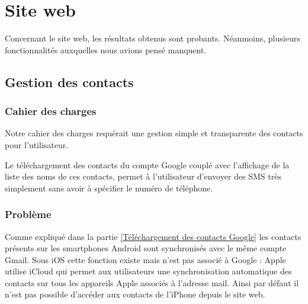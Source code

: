 \section{Site web}

Concernant le site web, les résultats obtenus sont probants.
Néanmoins, plusieurs fonctionnalités auxquelles nous avions pensé manquent.




\subsection{Gestion des contacts}


\subsubsection{Cahier des charges}

Notre cahier des charges requérait une gestion simple et transparente des contacts pour l'utilisateur.

Le téléchargement des contacts du compte Google couplé avec l'affichage de la liste des noms de ces contacts, permet à l'utilisateur d'envoyer des SMS très simplement sans avoir à spécifier le numéro de téléphone.


\subsubsection{Problème}

Comme expliqué dans la partie \ref{Téléchargement des contacts Google} les contacts présents sur les smartphones Android sont synchronisés avec le même compte Gmail.
Sous iOS cette fonction existe mais n'est pas associé à Google : Apple utilise iCloud qui permet aux utilisateurs une synchronisation automatique des contacts sur tous les appareils Apple associés à l'adresse mail.
Ainsi par défaut il n'est pas possible d'accéder aux contacts de l'iPhone depuis le site web.

